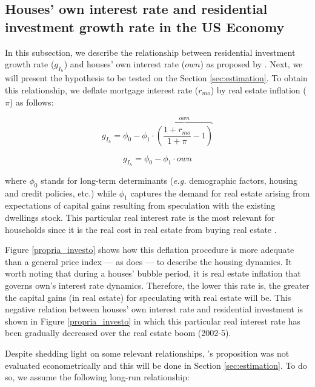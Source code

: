 \documentclass[12pt, a4]{article}
\begin{document}
\subsection{Houses' own interest rate and residential investment growth rate in the US	Economy}
\label{sec:org3db9ae5}
\label{sc:own}

In this subsection, we describe the relationship between residential investment growth rate (\(g_{I_h}\)) and houses' own interest rate (\(own\)) as proposed by \textcite{teixeira_crescimento_2015}. 
Next, we will present the hypothesis to be tested on the Section \ref{sec:estimation}. To obtain this relationship, we deflate mortgage interest rate (\(r_{mo}\)) by real estate inflation (\(\pi\)) as follows:

$$
g_{I_h} = \phi_0 - \phi_1\cdot \overbrace{\left(\frac{1+r_{mo}}{1+\pi} - 1\right)}^{own}
$$

\begin{equation}
g_{I_h} = \phi_0 - \phi_1\cdot own
\end{equation}

where \(\phi_0\) stands for long-term determinants (\emph{e.g.} demographic factors, housing and credit policies, etc.) while \(\phi_1\) captures the demand for real estate arising from expectations of capital gains resulting from speculation with the existing dwellings stock. 
This particular real interest rate is the most relevant for households since it is the real cost in real estate from buying real estate  \cite[p.~53]{teixeira_crescimento_2015}.

Figure \ref{propria_investo} shows how this deflation procedure is more adequate than a general price index --- as \textcite[p.~143--6]{fair_macroeconometric_2013} does --- to describe the housing dynamics. It worth noting that during a houses' bubble period, it is real estate inflation that governs own's interest rate dynamics.
Therefore, the lower this rate is, the greater the capital gains (in real estate) for speculating with real estate will be. This negative relation between houses' own interest rate and residential investment is shown in Figure \ref{propria_investo} in which this particular real interest rate has been gradually decreased over the real estate boom (2002-5).

Despite shedding light on some relevant relationships, \citeauthor*{teixeira_crescimento_2015}'s \citeyear{teixeira_crescimento_2015} proposition was not evaluated econometrically and this will be done in Section \ref{sec:estimation}. To do so, we assume the following long-run relationship:
\end{document}
